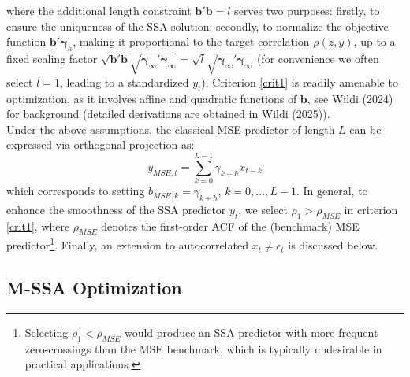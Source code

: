 \documentclass[11pt,a4paper]{article}
\begin{document}
where the additional length constraint $\mathbf{b}'\mathbf{b}=l$ serves two purposes: firstly, to ensure the uniqueness of the SSA solution; secondly, to normalize the objective function $\mathbf{b}'\boldsymbol{\gamma}_{h}$, making it proportional to the target correlation $\rho(z,y)$, up to a fixed scaling factor $\sqrt{\mathbf{b}'\mathbf{b}}\sqrt{\boldsymbol{\gamma}_{\infty}'\boldsymbol{\gamma}_{\infty}}=\sqrt{l}\sqrt{\boldsymbol{\gamma}_{\infty}'\boldsymbol{\gamma}_{\infty}}$ (for convenience we often select $l=1$, leading to a standardized $y_t$). 
Criterion \eqref{crit1} is readily amenable to optimization, as it involves affine and quadratic functions of $\mathbf{b}$, see Wildi (2024) for background (detailed derivations are obtained in Wildi (2025)). \\
Under the above assumptions, the classical MSE predictor of length $L$ can be expressed via orthogonal projection as:
\[
y_{MSE,t}=\sum_{k=0}^{L-1}\gamma_{k+h}x_{t-k}
\]
which corresponds to setting $b_{MSE,k}=\gamma_{k+h}$, $k=0,...,L-1$. In general, to enhance the smoothness of the SSA predictor $y_t$, we select $\rho_1>\rho_{MSE}$ in criterion \eqref{crit1},  where $\rho_{MSE}$ denotes the first-order ACF of the (benchmark) MSE predictor\footnote{Selecting $\rho_1<\rho_{MSE}$ would produce an SSA predictor with more frequent zero-crossings than the MSE benchmark, which is typically undesirable in practical applications.}. Finally,  an extension to autocorrelated $x_t\neq \epsilon_t$ is discussed below.
 




\subsection{M-SSA Optimization}
\end{document}
